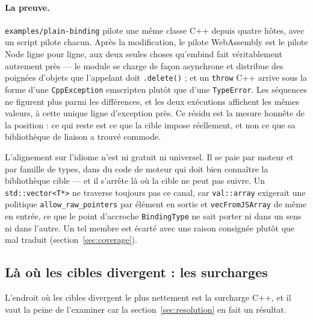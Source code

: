 \documentclass[11pt,a4paper]{article}
\newcommand{\code}[1]{\texttt{\small #1}}
\begin{document}
\paragraph{La preuve.} \code{examples/plain-binding} pilote une même classe C++
depuis quatre hôtes, avec un script pilote chacun. Après la modification, le
pilote WebAssembly est le pilote Node ligne pour ligne, aux deux seules choses
qu'embind fait véritablement autrement près --- le module se charge de façon
asynchrone et distribue des poignées d'objets que l'appelant doit
\code{.delete()} ; et un \code{throw} C++ arrive sous la forme d'une
\code{CppException} emscripten plutôt que d'une \code{TypeError}. Les séquences
ne figurent plus parmi les différences, et les deux exécutions affichent les
mêmes valeurs, à cette unique ligne d'exception près. Ce résidu est la mesure
honnête de la position : ce qui reste est ce que la cible impose réellement, et
non ce que sa bibliothèque de liaison a trouvé commode.

L'alignement sur l'idiome n'est ni gratuit ni universel. Il se paie par moteur
et par famille de types, dans du code de moteur qui doit bien connaître la
bibliothèque cible --- et il s'arrête là où la cible ne peut pas suivre. Un
\code{std::vector<T*>} ne traverse toujours pas ce canal, car \code{val::array}
exigerait une politique \code{allow\_raw\_pointers} par élément en sortie et
\code{vecFromJSArray} de même en entrée, ce que le point d'accroche
\code{BindingType} ne sait porter ni dans un sens ni dans l'autre. Un tel membre
est écarté avec une raison consignée plutôt que mal traduit
(section~\ref{sec:coverage}).

\subsection{Là où les cibles divergent : les surcharges}
\label{sec:overloads}

L'endroit où les cibles divergent le plus nettement est la surcharge C++, et il
vaut la peine de l'examiner car la section~\ref{sec:resolution} en fait un
résultat.
\end{document}
